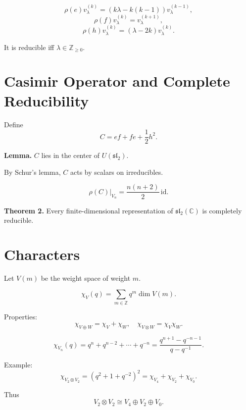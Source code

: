 \[
\rho(e)v_\lambda^{(k)} = (k\lambda-k(k-1))v_\lambda^{(k-1)},
\]
\[
\rho(f)v_\lambda^{(k)} = v_\lambda^{(k+1)},
\]
\[
\rho(h)v_\lambda^{(k)} = (\lambda-2k)v_\lambda^{(k)}.
\]

It is reducible iff $\lambda\in\mathbb{Z}_{\ge0}$.

\section*{Casimir Operator and Complete Reducibility}

Define
\[
C = ef + fe + \frac12 h^2.
\]

\textbf{Lemma.}
$C$ lies in the center of $U(\mathfrak{sl}_2)$.

By Schur’s lemma, $C$ acts by scalars on irreducibles.

\[
\rho(C)|_{V_n} = \frac{n(n+2)}{2}\,\mathrm{id}.
\]

\textbf{Theorem 2.}
Every finite-dimensional representation of
$\mathfrak{sl}_2(\mathbb{C})$ is completely reducible.

\section*{Characters}

Let $V(m)$ be the weight space of weight $m$.

\[
\chi_V(q)=\sum_{m\in\mathbb{Z}} q^m \dim V(m).
\]

Properties:
\[
\chi_{V\oplus W}=\chi_V+\chi_W,
\quad
\chi_{V\otimes W}=\chi_V\chi_W.
\]

\[
\chi_{V_n}(q)
=
q^n+q^{n-2}+\cdots+q^{-n}
=
\frac{q^{n+1}-q^{-n-1}}{q-q^{-1}}.
\]

Example:
\[
\chi_{V_2\otimes V_2}
=
(q^2+1+q^{-2})^2
=
\chi_{V_4}+\chi_{V_2}+\chi_{V_0}.
\]

Thus
\[
V_2\otimes V_2 \cong V_4\oplus V_2\oplus V_0.
\]